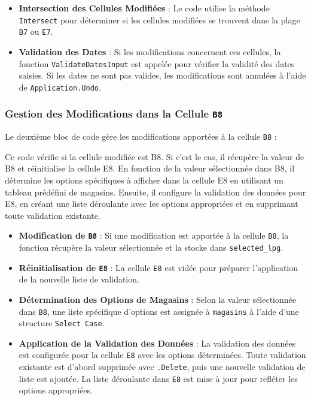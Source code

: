\documentclass[a4paper, oneside, 12pt, final]{extreport}
\begin{document}
\begin{itemize}
    \item \textbf{Intersection des Cellules Modifiées} : Le code utilise la méthode \texttt{Intersect} pour déterminer si les cellules modifiées se trouvent dans la plage \texttt{B7} ou \texttt{E7}.
    \item \textbf{Validation des Dates} : Si les modifications concernent ces cellules, la fonction \texttt{ValidateDatesInput} est appelée pour vérifier la validité des dates saisies. Si les dates ne sont pas valides, les modifications sont annulées à l'aide de \texttt{Application.Undo}.
\end{itemize}

\subsubsection{Gestion des Modifications dans la Cellule \texttt{B8}}

Le deuxième bloc de code gère les modifications apportées à la cellule \texttt{B8} :

Ce code vérifie si la cellule modifiée est B8. Si c'est le cas, il récupère la valeur de B8 et réinitialise la cellule E8. En fonction de la valeur sélectionnée dans B8, il détermine les options spécifiques à afficher dans la cellule E8 en utilisant un tableau prédéfini de magasins. Ensuite, il configure la validation des données pour E8, en créant une liste déroulante avec les options appropriées et en supprimant toute validation existante.

\begin{itemize}
    \item \textbf{Modification de \texttt{B8}} : Si une modification est apportée à la cellule \texttt{B8}, la fonction récupère la valeur sélectionnée et la stocke dans \texttt{selected\_lpg}.
    \item \textbf{Réinitialisation de \texttt{E8}} : La cellule \texttt{E8} est vidée pour préparer l'application de la nouvelle liste de validation.
    \item \textbf{Détermination des Options de Magasins} : Selon la valeur sélectionnée dans \texttt{B8}, une liste spécifique d'options est assignée à \texttt{magasins} à l'aide d'une structure \texttt{Select Case}.
    \item \textbf{Application de la Validation des Données} : La validation des données est configurée pour la cellule \texttt{E8} avec les options déterminées. Toute validation existante est d'abord supprimée avec \texttt{.Delete}, puis une nouvelle validation de liste est ajoutée. La liste déroulante dans \texttt{E8} est mise à jour pour refléter les options appropriées.
\end{itemize}
\end{document}
